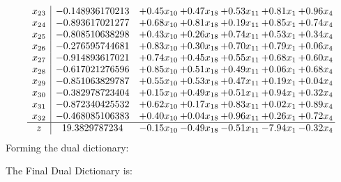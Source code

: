 \documentclass[8pt]{article}
\begin{document}
\[\begin{array}{c| c c@{\hskip 2pt} c@{\hskip 2pt} c@{\hskip 2pt} c@{\hskip 2pt} c@{\hskip 2pt} }
 x_{23}   &  -0.148936170213 & +  0.45 x_{10} & +  0.47 x_{18} & +  0.53 x_{11} & +  0.81 x_{1} & +  0.96 x_{4}\\
 x_{24}   &  -0.893617021277 & +  0.68 x_{10} & +  0.81 x_{18} & +  0.19 x_{11} & +  0.85 x_{1} & +  0.74 x_{4}\\
 x_{25}   &  -0.808510638298 & +  0.43 x_{10} & +  0.26 x_{18} & +  0.74 x_{11} & +  0.53 x_{1} & +  0.34 x_{4}\\
 x_{26}   &  -0.276595744681 & +  0.83 x_{10} & +  0.30 x_{18} & +  0.70 x_{11} & +  0.79 x_{1} & +  0.06 x_{4}\\
 x_{27}   &  -0.914893617021 & +  0.74 x_{10} & +  0.45 x_{18} & +  0.55 x_{11} & +  0.68 x_{1} & +  0.60 x_{4}\\
 x_{28}   &  -0.617021276596 & +  0.85 x_{10} & +  0.51 x_{18} & +  0.49 x_{11} & +  0.06 x_{1} & +  0.68 x_{4}\\
 x_{29}   &  -0.851063829787 & +  0.55 x_{10} & +  0.53 x_{18} & +  0.47 x_{11} & +  0.19 x_{1} & +  0.04 x_{4}\\
 x_{30}   &  -0.382978723404 & +  0.15 x_{10} & +  0.49 x_{18} & +  0.51 x_{11} & +  0.94 x_{1} & +  0.32 x_{4}\\
 x_{31}   &  -0.872340425532 & +  0.62 x_{10} & +  0.17 x_{18} & +  0.83 x_{11} & +  0.02 x_{1} & +  0.89 x_{4}\\
 x_{32}   &  -0.468085106383 & +  0.40 x_{10} & +  0.04 x_{18} & +  0.96 x_{11} & +  0.26 x_{1} & +  0.72 x_{4}\\
\hline
z    &  19.3829787234 & -0.15 x_{10} & -0.49 x_{18} & -0.51 x_{11} & -7.94 x_{1} & -0.32 x_{4}\\
\end{array}\]
Forming the dual dictionary:

The Final Dual Dictionary is: 
\end{document}
